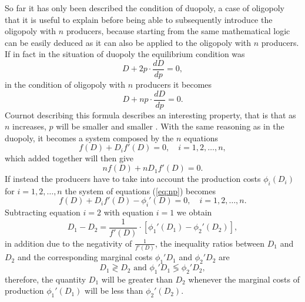 \documentclass[12pt]{article}
\numberwithin{equation}{subsection}
\begin{document}
So far it has only been described the condition of duopoly, a case of oligopoly that it is useful to explain before being able to subsequently introduce the oligopoly with $n$ producers, because starting from the same mathematical logic can be easily deduced as it can also be applied to the oligopoly with $n$ producers. If in fact in the situation of duopoly the equilibrium condition was \citep[p. 82]{cournot1897researches} \begin{equation*}
D + 2p \cdot \frac{dD}{dp} = 0,
\end{equation*} in the condition of oligopoly with $n$ producers it becomes \citep[p. 84]{cournot1897researches} \begin{equation*}
D + np \cdot \frac{dD}{dp} = 0.
\end{equation*} Cournot describing this formula describes an interesting property, that is that as $n$ increases, $p$ will be smaller and smaller \cite[p. 84]{cournot1897researches}. With the same reasoning as in the duopoly, it becomes a system composed by the $n$ equations \begin{equation}
\label{eq:np}
f(D) + D_if'(D) = 0,\quad i = 1,2, \ldots, n,
\end{equation} which added together will then give \citep[p. 85]{cournot1897researches} \begin{equation*}
nf(D) + nD_1f'(D) = 0.
\end{equation*} If instead the producers have to take into account the production costs $\phi_i(D_i)$ for $i = 1, 2, \ldots,n$ the system of equations (\ref{eq:np}) becomes \citep[p. 85]{cournot1897researches}\begin{equation}
\label{eq:2.7}
f(D) + D_if'(D) - \phi_i '(D) = 0,\quad i = 1,2, \ldots, n.
\end{equation}
Subtracting equation $i = 2$ with equation $i = 1$ we obtain \citep[p. 85]{cournot1897researches} \begin{equation}
\label{eq:duo_c}
D_1 - D_2 = \frac{1}{f'(D)} \cdot \left[\phi_1 '(D_1) - \phi_2 '(D_2) \right],
\end{equation} in addition due to the negativity of $\frac{1}{f'(D)}$, the inequality ratios between $D_1$ and $D_2$ and the corresponding marginal costs $\phi_1 'D_1$ and $\phi_2 'D_2$ are \citep[p. 85]{cournot1897researches}\begin{equation*}
D_1 \gtrless D_2 \text{ and } \phi_1 'D_1 \lessgtr \phi_2 'D_2,
\end{equation*} therefore, the quantity $D_1$ will be greater than $D_2$ whenever the marginal costs of production $\phi_1 '(D_1)$ will be less than $\phi_2 '(D_2)$. 
\end{document}
